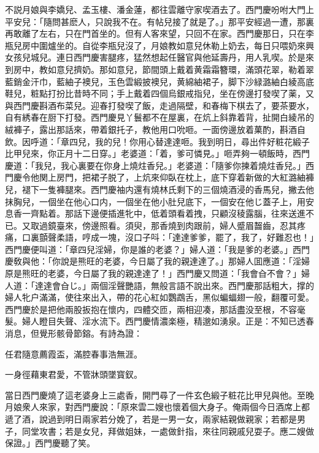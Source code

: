 不説月娘與李嬌兒、孟玉樓、潘金蓮，都往雲離守家喫酒去了。西門慶吩咐大門上平安兒：「隨問甚麽人，只說我不在。有帖兒接了就是了。」那平安經過一遭，那裏再敢離了左右，只在門首坐的。但有人客來望，只回不在家。西門慶那日，只在李瓶兒房中圍爐坐的。自從李瓶兒沒了，月娘教如意兒休勒上奶去，每日只喂奶來興女孩兒城兒。連日西門慶害腿疼，猛然想起任醫官與他延壽丹，用人乳喫。於是來到房中，教如意兒擠奶。那如意兒，節間頭上戴着黄霜霜簪環，滿頭花翠，勒着翠藍銷金汗巾，藍紬子襖兒，玉色雲緞披襖兒，黄綿紬裙子，脚下沙緑潞紬白綾高底鞋兒，粧點打扮比昔時不同；手上戴着四個烏銀戒指兒，坐在傍邊打發喫了薬，又與西門慶斟酒布菜兒。迎春打發喫了飯，走過隔壁，和春梅下棋去了，要茶要水，自有綉春在厨下打發。西門慶見丫鬟都不在屋裏，在炕上斜靠着背，扯開白綾吊的絨褲子，露出那話來，帶着銀托子，教他用口吮咂。一面傍邊放着菓酌，斟酒自飲。因呼道：「章四兒，我的兒！你用心替達達咂。我到明日，尋出件好粧花緞子比甲兒來，你正月十二日穿。」老婆道：「着，爹可憐見。」咂弄夠一頓飯時，西門慶道：「我兒，我心裏要在你身上燒炷香兒。」老婆道：「隨爹你揀着燒炷香兒。」西門慶令他関上房門，把裙子脱了，上炕來仰臥在枕上，底下穿着新做的大紅潞紬褲兒，褪下一隻褲腿來。西門慶袖内還有燒林氏剩下的三個燒酒浸的香馬兒，撇去他抹胸兒，一個坐在他心口内，一個坐在他小肚兒底下，一個安在他じ蓋子上，用安息香一齊點着。那話下邊便插進牝中，低着頭看着拽，只顧沒稜露腦，往來送進不已。又取過鏡臺來，傍邊照看。須臾，那香燒到肉跟前，婦人蹙眉齧齒，忍其疼痛，口裏顫聲柔語，哼成一塊，沒口子呌：「達達爹爹，罷了，我了，好難忍也！」西門慶便叫道：「章四兒淫婦，你是誰的老婆？」婦人道：「我是爹的老婆。」西門慶敎與他：「你說是熊旺的老婆，今日屬了我的親達達了。」那婦人囬應道：「淫婦原是熊旺的老婆，今日屬了我的親達達了！」西門慶又問道：「我會㒲不會？」婦人道：「達達會㒲じ。」兩個淫聲艷語，無般言語不說出來。西門慶那話粗大，撑的婦人牝户滿滿，使往來出入，帶的花心紅如鸚鵡舌，黑似蝙蝠翅一般，翻覆可愛。西門慶於是把他兩股扳抱在懷内，四體交匝，兩相迎凑，那話盡没至根，不容毫髮。婦人瞪目失聲、淫水流下。西門慶情濃楽極，精邈如湧泉。正是：不知已透春消息，但覺形骸骨節鎔。有詩為證：

\begin{myquote}
任君隨意薦霞盃，滿腔春事浩無涯。

一身徑藉東君愛，不管牀頭墜寳釵。
\end{myquote}

當日西門慶燒了這老婆身上三處香，開門尋了一件玄色緞子粧花比甲兒與他。至晚月娘衆人來家，對西門慶說：「原來雲二嫂也懷着個大身子。俺兩個今日酒席上都遞了酒，說過到明日兩家若分娩了，若是一男一女，兩家結親做親家；若都是男子，同堂攻書；若是女兒，拜做姐妹，一處做針指，來往同親戚兒耍子。應二嫂做保證。」西門慶聽了笑。

